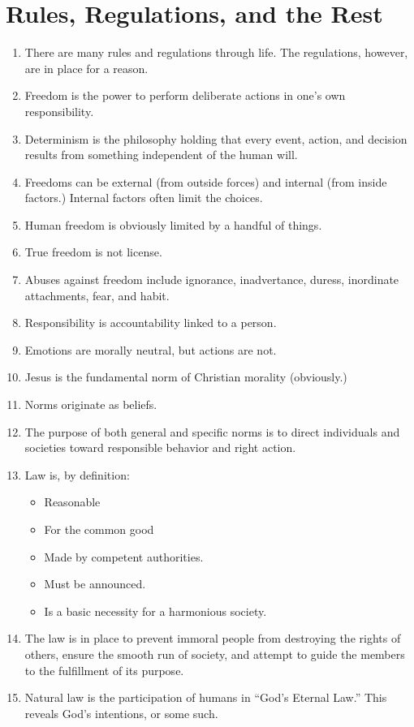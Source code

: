 \documentclass[10pt]{article}
\begin{document}
\section{Rules, Regulations, and the Rest}
\begin{enumerate}
	\item There are many rules and regulations through life.  The regulations, 
		however, are in place for a reason.
	\item Freedom is the power to perform deliberate actions in one's own responsibility.
	\item Determinism is the philosophy holding that every event, action, and 
		decision results from something independent of the human will.
	\item Freedoms can be external (from outside forces) and internal (from 
		inside factors.)  Internal factors often limit the choices.
	\item Human freedom is obviously limited by a handful of things.
	\item True freedom is not license.
	\item Abuses against freedom include ignorance, inadvertance, duress, 
		inordinate attachments, fear, and habit.
	\item Responsibility is accountability linked to a person.  
	\item Emotions are morally neutral, but actions are not.  
	\item Jesus is the fundamental norm of Christian morality (obviously.)  
	\item Norms originate as beliefs.  
	\item The purpose of both general and specific norms is to direct 
		individuals and societies toward responsible behavior and right 
		action.
	\item Law is, by definition:
		\begin{itemize}
			\item Reasonable
			\item For the common good
			\item Made by competent authorities.
			\item Must be announced.
			\item Is a basic necessity for a harmonious society.
			\end{itemize}
	\item The law is in place to prevent immoral people from destroying the 
		rights of others, ensure the smooth run of society, and attempt to 
		guide the members to the fulfillment of its purpose.
	\item Natural law is the participation of humans in ``God's Eternal Law.''  
		This reveals God's intentions, or some such.
\end{enumerate}
\end{document}
